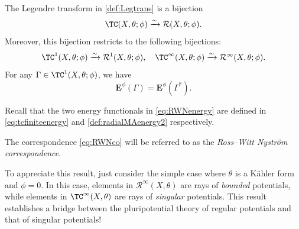 \begin{theorem}\label{thm:Legenbij}
    The Legendre transform in \cref{def:Legtrans} is a bijection
    \begin{equation}\label{eq:RWNco}
        \TC(X,\theta;\phi)\xrightarrow{\sim} \mathcal{R}(X,\theta;\phi).
    \end{equation}
    Moreover, this bijection restricts to the following bijections:
    \begin{equation}\label{eq:RWNcotwocases}
    \TC^1(X,\theta;\phi)\xrightarrow{\sim} \mathcal{R}^1(X,\theta;\phi),\quad \TC^{\infty}(X,\theta;\phi)\xrightarrow{\sim} \mathcal{R}^{\infty}(X,\theta;\phi).
    \end{equation}
    For any $\Gamma\in \TC^1(X,\theta;\phi)$, we have
    \begin{equation}\label{eq:RWNenergy}
    \mathbf{E}^{\phi}(\Gamma)=\mathbf{E}^{\phi}(\Gamma^*).
    \end{equation}
\end{theorem}
Recall that the two energy functionals in \eqref{eq:RWNenergy} are defined in \eqref{eq:tcfiniteenergy} and \cref{def:radialMAenergy2} respectively.

The correspondence \eqref{eq:RWNco} will be referred to as the \emph{Ross--Witt Nyström correspondence}.

To appreciate this result, just consider the simple case where $\theta$ is a Kähler form and $\phi=0$. In this case, elements in $\mathcal{R}^{\infty}(X,\theta)$ are rays of \emph{bounded} potentials, while elements in $\TC^{\infty}(X,\theta)$ are rays of \emph{singular} potentials. This result establishes a bridge between the pluripotential theory of regular potentials and that of singular potentials!

